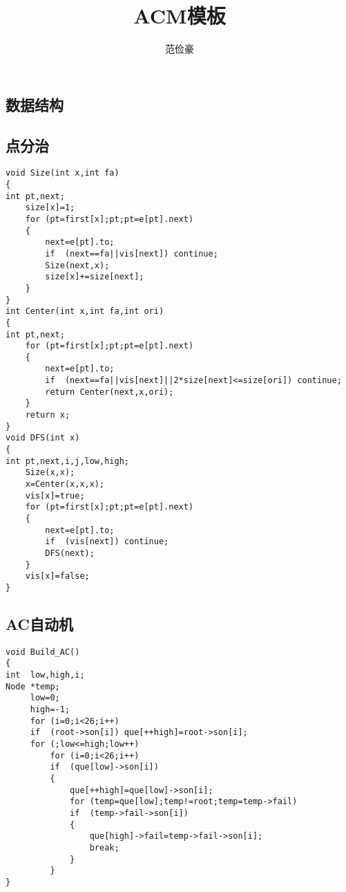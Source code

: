 \documentclass{article}
\author{范俭豪}
\title{ACM模板}
\begin{document}
\begin{CJK*}{UTF8}{song}
\tableofcontents
\section{数据结构}
\subsection{点分治}
\begin{lstlisting}
void Size(int x,int fa)
{
int pt,next;
    size[x]=1;
    for (pt=first[x];pt;pt=e[pt].next)
    {
        next=e[pt].to;
        if  (next==fa||vis[next]) continue;
        Size(next,x);
        size[x]+=size[next];
    }
}
int Center(int x,int fa,int ori)
{
int pt,next;
    for (pt=first[x];pt;pt=e[pt].next)
    {
        next=e[pt].to;
        if  (next==fa||vis[next]||2*size[next]<=size[ori]) continue;
        return Center(next,x,ori);
    }
    return x;
}
void DFS(int x)
{
int pt,next,i,j,low,high;
    Size(x,x);
    x=Center(x,x,x);
    vis[x]=true;
    for (pt=first[x];pt;pt=e[pt].next)
    {
        next=e[pt].to;
        if  (vis[next]) continue;
        DFS(next);
    }
    vis[x]=false;
}
\end{lstlisting}
\subsection{AC自动机}
\begin{lstlisting}
void Build_AC()
{
int  low,high,i;
Node *temp;
     low=0;
     high=-1;
     for (i=0;i<26;i++)
     if  (root->son[i]) que[++high]=root->son[i];
     for (;low<=high;low++)
         for (i=0;i<26;i++)
         if  (que[low]->son[i])
         {
             que[++high]=que[low]->son[i];
             for (temp=que[low];temp!=root;temp=temp->fail)
             if  (temp->fail->son[i])
             {
                 que[high]->fail=temp->fail->son[i];
                 break;
             }
         }
}
\end{lstlisting}

\end{CJK*}
\end{document}
